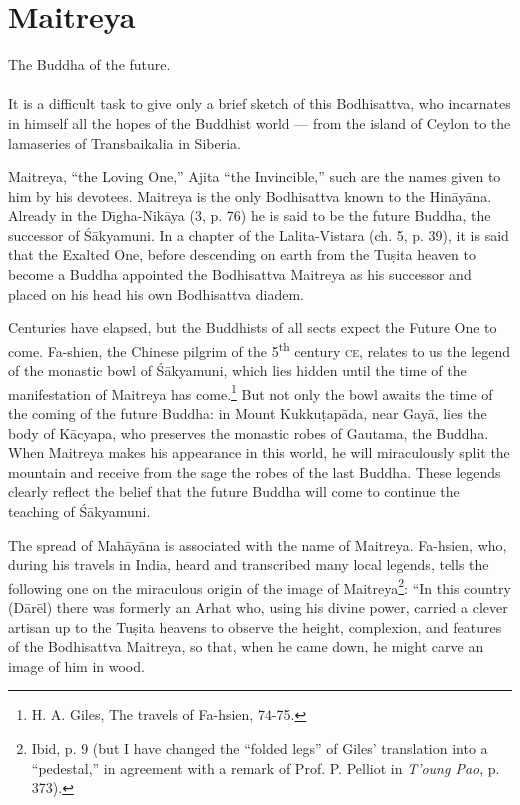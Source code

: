 \documentclass[a4paper, 12pt, oneside]{article}
\begin{document}
\clearpage
\section{Maitreya}
\begin{center}
The Buddha of the future.
\end{center}
\paragraph{}
It is a difficult task to give only a brief sketch of this Bodhisattva, who incarnates in himself all the hopes of the Buddhist world --- from the island of Ceylon to the lamaseries of Transbaikalia in Siberia.

Maitreya, ``the Loving One,'' Ajita ``the Invincible,'' such are the names given to him by his devotees. Maitreya is the only Bodhisattva known to the Hin\={a}y\={a}na. Already in the D\={\i}gha-Nik\={a}ya (3, p. 76) he is said to be the future Buddha, the successor of \'{S}\={a}kyamuni. In a chapter of the Lalita-Vistara (ch. 5, p. 39), it is said that the Exalted One, before descending on earth from the Tu\d{s}ita heaven to become a Buddha appointed the Bodhisattva Maitreya as his successor and placed on his head his own Bodhisattva diadem.

Centuries have elapsed, but the Buddhists of all sects expect the Future One to come. Fa-shien, the Chinese pilgrim of the 5\textsuperscript{th} century \textsc{ce}, relates to us the legend of the monastic bowl of \'{S}\={a}kyamuni, which lies hidden until the time of the manifestation of Maitreya has come.\footnote{H. A. Giles, The travels of Fa-hsien, 74-75.} But not only the bowl awaits the time of the coming of the future Buddha: in Mount Kukku\d{t}ap\={a}da, near Gay\={a}, lies the body of K\={a}cyapa, who preserves the monastic robes of Gautama, the Buddha. When Maitreya makes his appearance in this world, he will miraculously split the mountain and receive from the sage the robes of the last Buddha. These legends clearly reflect the belief that the future Buddha will come to continue the teaching of \'{S}\={a}kyamuni.

The spread of Mah\={a}y\={a}na is associated with the name of Maitreya. Fa-hsien, who, during his travels in India, heard and transcribed many local legends, tells the following one on the miraculous origin of the image of Maitreya\footnote{Ibid, p. 9 (but I have changed the ``folded legs'' of Giles' translation into a ``pedestal,'' in agreement with a remark of Prof. P. Pelliot in \emph{T'oung Pao}, p. 373).}: ``In this country (D\={a}r\={e}l) there was formerly an Arhat who, using his divine power, carried a clever artisan up to the Tu\d{s}ita heavens to observe the height, complexion, and features of the Bodhisattva Maitreya, so that, when he came down, he might carve an image of him in wood.
\end{document}
